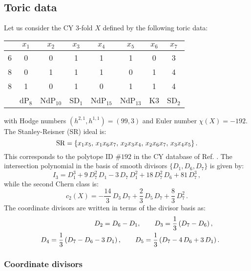 \documentclass[11pt,a4paper]{article}
\newcommand{\bea}{\begin{eqnarray}}
\newcommand{\eea}{\end{eqnarray}}
\newcommand{\be}{\begin{equation}}
\newcommand{\ee}{\end{equation}}
\def\nn{\nonumber}
\begin{document}
\subsection{Toric data}

Let us consider the CY 3-fold $X$ defined by the following toric data:
\begin{table}[H]
  \centering
 \begin{tabular}{|c|ccccccc|}
\hline
     & $x_1$  & $x_2$  & $x_3$  & $x_4$  & $x_5$ & $x_6$  & $x_7$       \\
    \hline
6 & 0  & 0 & 1 & 1 & 1 & 0  & 3   \\
8 & 0  & 1 & 1 & 1 & 0 & 1  & 4   \\
8 & 1  & 0 & 1 & 0 & 1 & 1  & 4   \\   \hline
  & dP$_8$  & NdP$_{10}$ & SD$_1$ &  NdP$_{15}$ & NdP$_{13}$ & K3  &  SD$_2$  \\
    \hline
  \end{tabular}
 \end{table}
 \noindent
with Hodge numbers $(h^{2,1}, h^{1,1}) = (99, 3)$ and Euler number $\chi(X)=-192$. The Stanley-Reisner (SR) ideal is:
\be
{\rm SR} =  \{x_1 x_5,\, x_1 x_6 x_7,\, x_2 x_3 x_4,\, x_2 x_6 x_7,\, x_3 x_4 x_5 \} \,. \nn
\ee
This corresponds to the polytope ID $\#192$ in the CY database of Ref. \cite{Altman:2014bfa}. The intersection polynomial in the basis of smooth divisors $\{D_1, D_6, D_7\}$ is given by:
\be
I_3={D_1^3+ 9 \,D_7^2\, D_1 -3\, D_7\, D_1^2+ 18\, D_7^2\, D_6+  81\, D_7^3}\,,
\label{I3a}
\ee
while the second Chern class is:
\be
c_2 (X) = -\frac{14}{3}\, D_3\, D_7 + \frac23\, D_5\, D_7 +\frac83\, D_7^2\,.
\label{eq:c2a}
\ee
The coordinate divisors are written in terms of the divisor basis as:
\bea
&  & \hskip-0cm D_2 = D_6 - D_1, \qquad D_3 = \frac13 \left(D_7 -  D_6 \right), \quad \\
& &  D_4  = \frac13 \left(D_7 -  D_6  -3\, D_1 \right),   \qquad D_5 =  \frac13 \left(D_7 -4\,  D_6 + 3\, D_1 \right). \nn
\eea

\subsubsection{Coordinate divisors}
\end{document}

